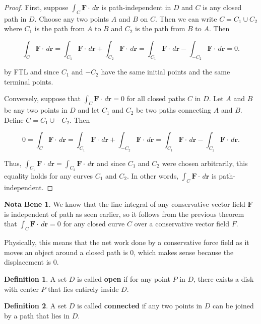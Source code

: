 \documentclass[11pt,oneside,english]{amsart}
\theoremstyle{definition}
\newtheorem*{definition}{Definition}
\newtheorem*{note}{Nota Bene}
\begin{document}
\begin{proof}
First, suppose  $\int_C\mathbf{F}\cdot\,d\mathbf{r}$ is path-independent in $D$ and $C$ is any closed path in $D$. Choose any two points $A$ and $B$ on $C$. Then we can write $C=C_1\cup C_2$ where $C_1$ is the path from $A$ to $B$ and $C_2$ is the path from $B$ to $A$. Then

\[
\int_C\mathbf{F}\cdot\,d\mathbf{r}=\int_{C_1}\mathbf{F}\cdot\,d\mathbf{r}+\int_{C_2}\mathbf{F}\cdot\,d\mathbf{r}=\int_{C_1}\mathbf{F}\cdot\,d\mathbf{r}-\int_{-C_2}\mathbf{F}\cdot\,d\mathbf{r}=0.
\]

by FTL and since $C_1$ and $-C_2$ have the same initial points and the same terminal points.

Conversely, suppose that $\displaystyle \int_C\mathbf{F}\cdot\,d\mathbf{r}=0$ for all closed paths $C$ in $D$. Let $A$ and $B$ be any two points in $D$ and let $C_1$ and $C_2$ be two paths connecting $A$ and $B$. Define $C=C_1\cup -C_2$. Then

\[
0=\int_C\mathbf{F}\cdot\,d\mathbf{r}=\int_{C_1}\mathbf{F}\cdot\,d\mathbf{r}+\int_{-C_2}\mathbf{F}\cdot\,d\mathbf{r}=\int_{C_1}\mathbf{F}\cdot\,d\mathbf{r}-\int_{C_2}\mathbf{F}\cdot\,d\mathbf{r}.
\]

Thus, $\displaystyle \int_{C_1}\mathbf{F}\cdot\,d\mathbf{r}=\int_{C_2}\mathbf{F}\cdot\,d\mathbf{r}$ and since $C_1$ and $C_2$ were chosen arbitrarily, this equality holds for any curves $C_1$ and $C_2$. In other words, $\int_C\mathbf{F}\cdot\,d\mathbf{r}$ is path-independent.
\end{proof}


\begin{note}
We know that the line integral of any conservative vector field $\mathbf{F}$ is independent of path as seen earlier, so it follows from the previous theorem that $\int_C\mathbf{F}\cdot\,d\mathbf{r}=0$ for any closed curve $C$ over a conservative vector field $F$.

Physically, this means that the net work done by a conservative force field as it moves an object around a closed path is 0, which makes sense because the displacement is 0.
\end{note}



\begin{definition}
A set $D$ is called \textbf{open} if for any point $P$ in $D$, there exists a disk with center $P$ that lies entirely inside $D$.
\end{definition}

\begin{definition}
A set $D$ is called \textbf{connected} if any two points in $D$ can be joined by a path that lies in $D$.
\end{definition}
\end{document}
